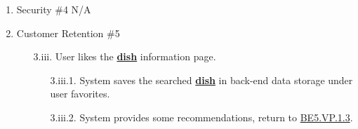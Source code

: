 \documentclass[]{article}
\begin{document}
\begin{enumerate}[{\bf BE1.}]
\begin{enumerate}[{\bf VP1.}]
\begin{enumerate}
				\end{enumerate}
			\item Security \#4 
				N/A
			\item Customer Retention \#5
				\begin{enumerate}
					\item[3.iii.] User likes the \hyperref[Dish]{\textbf{dish}} information page.
					\begin{enumerate}
						\item[3.iii.1.] System saves the searched \hyperref[Dish]{\textbf{dish}} in back-end data storage under user favorites.
						\item[3.iii.2.] System provides some recommendations, return to \hyperlink{BE5.VP.1.3}{BE5.VP.1.3}.
					\end{enumerate}
				\end{enumerate}
		\end{enumerate}


\end{enumerate}
\end{document}
